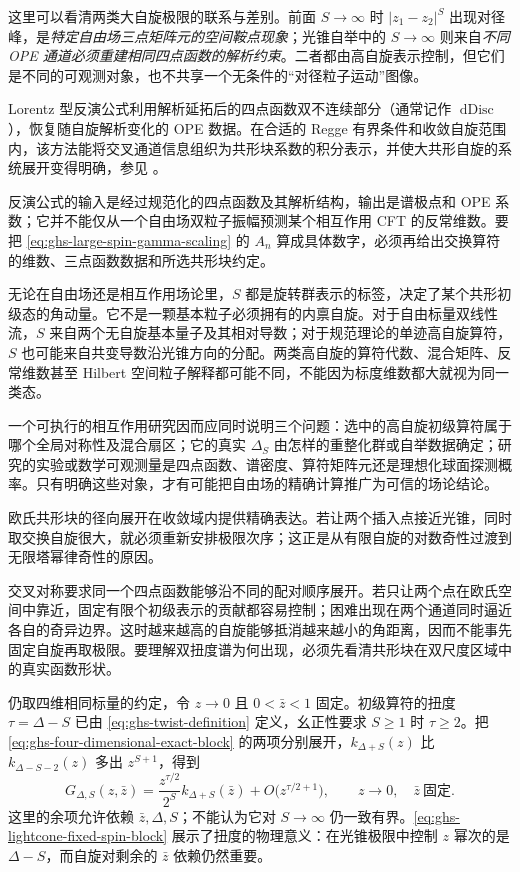 这里可以看清两类大自旋极限的联系与差别。前面 $S\to\infty$ 时 $|z_1-z_2|^S$ 出现对径峰，是\emph{特定自由场三点矩阵元的空间鞍点现象}；光锥自举中的 $S\to\infty$ 则来自\emph{不同 OPE 通道必须重建相同四点函数的解析约束}。二者都由高自旋表示控制，但它们是不同的可观测对象，也不共享一个无条件的“对径粒子运动”图像。


Lorentz 型反演公式利用解析延拓后的四点函数双不连续部分（通常记作 $\operatorname{dDisc}$），恢复随自旋解析变化的 OPE 数据。在合适的 Regge 有界条件和收敛自旋范围内，该方法能将交叉通道信息组织为共形块系数的积分表示，并使大共形自旋的系统展开变得明确，参见 \cite{ghs-caronhuot}。

反演公式的输入是经过规范化的四点函数及其解析结构，输出是谱极点和 OPE 系数；它并不能仅从一个自由场双粒子振幅预测某个相互作用 CFT 的反常维数。要把 \cref{eq:ghs-large-spin-gamma-scaling} 的 $A_n$ 算成具体数字，必须再给出交换算符的维数、三点函数数据和所选共形块约定。


无论在自由场还是相互作用场论里，$S$ 都是旋转群表示的标签，决定了某个共形初级态的角动量。它不是一颗基本粒子必须拥有的内禀自旋。对于自由标量双线性流，$S$ 来自两个无自旋基本量子及其相对导数；对于规范理论的单迹高自旋算符，$S$ 也可能来自共变导数沿光锥方向的分配。两类高自旋的算符代数、混合矩阵、反常维数甚至 Hilbert 空间粒子解释都可能不同，不能因为标度维数都大就视为同一类态。

一个可执行的相互作用研究因而应同时说明三个问题：选中的高自旋初级算符属于哪个全局对称性及混合扇区；它的真实 $\Delta_S$ 由怎样的重整化群或自举数据确定；研究的实验或数学可观测量是四点函数、谱密度、算符矩阵元还是理想化球面探测概率。只有明确这些对象，才有可能把自由场的精确计算推广为可信的场论结论。


欧氏共形块的径向展开在收敛域内提供精确表达。若让两个插入点接近光锥，同时取交换自旋很大，就必须重新安排极限次序；这正是从有限自旋的对数奇性过渡到无限塔幂律奇性的原因。


交叉对称要求同一个四点函数能够沿不同的配对顺序展开。若只让两个点在欧氏空间中靠近，固定有限个初级表示的贡献都容易控制；困难出现在两个通道同时逼近各自的奇异边界。这时越来越高的自旋能够抵消越来越小的角距离，因而不能事先固定自旋再取极限。要理解双扭度谱为何出现，必须先看清共形块在双尺度区域中的真实函数形状。


仍取四维相同标量的约定，令 $z\to0$ 且 $0<\bar z<1$ 固定。初级算符的扭度 $\tau=\Delta-S$ 已由 \cref{eq:ghs-twist-definition} 定义，幺正性要求 $S\ge1$ 时 $\tau\ge2$。把 \cref{eq:ghs-four-dimensional-exact-block} 的两项分别展开，$k_{\Delta+S}(z)$ 比 $k_{\Delta-S-2}(z)$ 多出 $z^{S+1}$，得到
\begin{equation}\label{eq:ghs-lightcone-fixed-spin-block}
 G_{\Delta,S}(z,\bar z)
 =\frac{z^{\tau/2}}{2^S}k_{\Delta+S}(\bar z)
 +O\bigl(z^{\tau/2+1}\bigr),
 \qquad z\to0,\quad \bar z\ \text{固定}.
\end{equation}
这里的余项允许依赖 $\bar z,\Delta,S$；不能认为它对 $S\to\infty$ 仍一致有界。\cref{eq:ghs-lightcone-fixed-spin-block} 展示了扭度的物理意义：在光锥极限中控制 $z$ 幂次的是 $\Delta-S$，而自旋对剩余的 $\bar z$ 依赖仍然重要。


